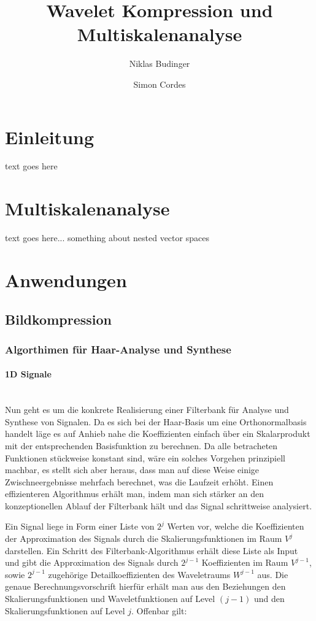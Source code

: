 \documentclass{article}
\begin{document}
\title{Wavelet Kompression und Multiskalenanalyse}
\author{Niklas Budinger \and Simon Cordes}
\maketitle

\section{Einleitung}

text goes here

\section{Multiskalenanalyse}

text goes here... something about nested vector spaces

\section{Anwendungen}

\subsection{Bildkompression}

\subsubsection{Algorthimen für Haar-Analyse und Synthese}

\paragraph{1D Signale}~\\
Nun geht es um die konkrete Realisierung einer Filterbank für Analyse und Synthese von Signalen. Da es sich bei der Haar-Basis um eine Orthonormalbasis handelt läge es auf Anhieb nahe die Koeffizienten einfach über ein Skalarprodukt mit der entsprechenden Basisfunktion zu berechnen. Da alle betracheten Funktionen stückweise konstant sind, wäre ein solches Vorgehen prinzipiell machbar, es stellt sich aber heraus, dass man auf diese Weise einige Zwischneergebnisse mehrfach berechnet, was die Laufzeit erhöht. Einen effizienteren Algorithmus erhält man, indem man sich stärker an den konzeptionellen Ablauf der Filterbank hält und das Signal schrittweise analysiert.

Ein Signal liege in Form einer Liste von $2^j$ Werten vor, welche die Koeffizienten der Approximation des Signals durch die Skalierungsfunktionen im Raum $V^j$ darstellen. Ein Schritt des Filterbank-Algorithmus erhält diese Liste als Input und gibt die Approximation des Signals durch $2^{j-1}$ Koeffizienten im Raum $V^{j-1}$, sowie $2^{j-1}$ zugehörige Detailkoeffizienten des Waveletraums $W^{j-1}$ aus. Die genaue Berechnungsvorschrift hierfür erhält man aus den Beziehungen den Skalierungsfunktionen und Waveletfunktionen auf Level $(j-1)$ und den Skalierungsfunktionen auf Level $j$. Offenbar gilt:
\end{document}
